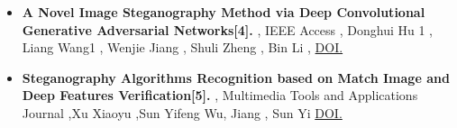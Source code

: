 \documentclass{beamer} %
\theoremstyle{definition} %
\begin{document}
\begin{itemize}
	\item{\textbf{A Novel Image Steganography Method via Deep Convolutional Generative Adversarial Networks[4]. }, IEEE Access , Donghui Hu 1 , Liang Wang1 , Wenjie Jiang , Shuli Zheng ,  Bin Li , \href{https://doi.org/10.1109/ACCESS.2018.2852771}{DOI. }}
\end{itemize}
\newpage
\begin{itemize}
     \item {\textbf{Steganography Algorithms Recognition based on Match
     Image and Deep Features Verification[5]. } , Multimedia Tools and Applications Journal ,Xu Xiaoyu ,Sun Yifeng Wu, Jiang , Sun Yi \href{https://doi.org/10.1007/s11042-018-6010-9}{DOI. }}
  
\end{itemize}
\end{document}

